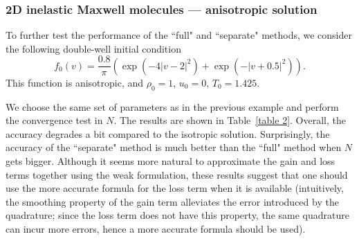 \documentclass[review, times]{elsarticle}
\begin{document}
\subsubsection{2D inelastic Maxwell molecules --- anisotropic solution}

To further test the performance of the ``full" and ``separate" methods, we consider the following double-well initial condition
\begin{equation}
  f_0(v) = \frac{0.8}{\pi}\left(\exp(-4|v-2|^2) + \exp(-|v+0.5|^2)\right).
\end{equation}
This function is anisotropic, and $\rho_0=1$, $u_0=0$, $T_0=1.425$.

We choose the same set of parameters as in the previous example and perform the convergence test in $N$. The results are shown in Table~\ref{table 2}. Overall, the accuracy degrades a bit compared to the isotropic solution. Surprisingly, the accuracy of the ``separate" method is much better than the ``full" method when $N$ gets bigger. Although it seems more natural to approximate the gain and loss terms together using the weak formulation, these results suggest that one should use the more accurate formula for the loss term when it is available (intuitively, the smoothing property of the gain term \cite{Lions94} alleviates the error introduced by the quadrature; since the loss term does not have this property, the same quadrature can incur more errors, hence a more accurate formula should be used).
\end{document}
